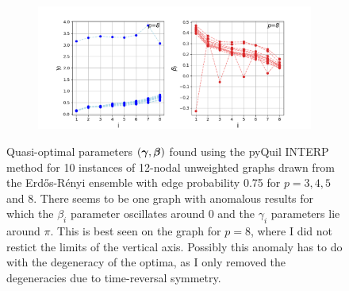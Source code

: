 \begin{figure}[H]
\begin{subfigure}[t]{0.7\textwidth}
	\end{subfigure}
	\\
	\centering
	\begin{subfigure}[t]{0.7\textwidth}
		\centering
		\includegraphics[width=\textwidth]{figures/interp/patterns/pattern_12-nodal_ER075_p-8.png}
	\end{subfigure}
	\caption{Quasi-optimal parameters $(\bm{\gamma},\bm{\beta})$ found using the pyQuil INTERP method for 10 instances of 12-nodal unweighted graphs drawn from the Erd\H{o}s-R\'enyi ensemble with edge probability 0.75 for $p = 3, 4, 5$ and 8. There seems to be one graph with anomalous results for which the $\beta_i$ parameter  oscillates around 0 and the $\gamma_i$ parameters lie around $\pi$. This is best seen on the graph for $p=8$, where I did not restict the limits of the vertical axis. Possibly this anomaly has to do with the degeneracy of the optima, as I only removed the degeneracies due to time-reversal symmetry.}
	\label{fig:appendix-patterns-12-nodal-ER075}
\end{figure}

